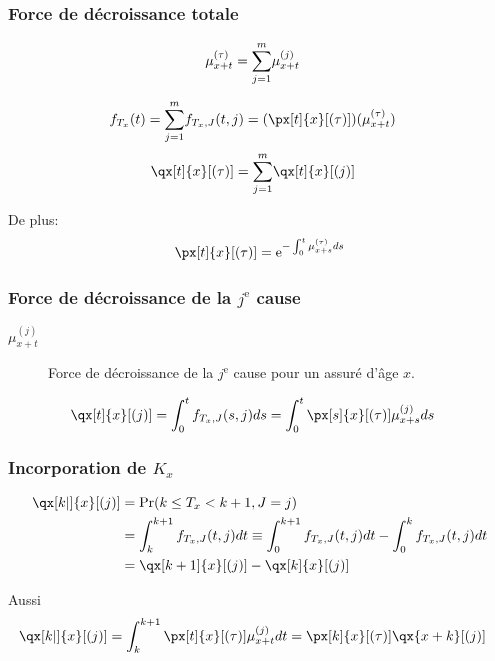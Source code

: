 \documentclass[10pt, french]{article}
\begin{document}
\begin{multicols*}{2}
\subsubsection*{Force de décroissance totale}
\begin{align*}
	\mu_{x + t}^{(\tau)}
	&=	\overset{m}{\underset{j = 1}{\sum}} \mu_{x + t}^{(j)}
\end{align*}

\begin{align*}
	f_{T_{x}}(t)
	&=	\sumz{m}{j = 1}f_{T_{x}, J}(t, j)	
	=	(\px[t]{x}[(\tau)])(\mu_{x + t}^{(\tau)})
\end{align*}
\begin{align*}
	\qx[t]{x}[(\tau)]
	&=	\sumz{m}{j = 1} \qx[t]{x}[(j)]
\end{align*}

De plus:
\begin{align*}
	\px[t]{x}[(\tau)]
	=	\textrm{e}^{-\int_{0}^{t} \mu_{x + s}^{(\tau)}ds}
\end{align*}

\subsubsection*{Force de décroissance de la $j^{\text{e}}$ cause}
\begin{description}
	\item[$\mu_{x + t}^{(j)}$]	Force de décroissance de la $j^{\text{e}}$ cause pour un assuré d'âge $x$.
\end{description}
\begin{align*}
	\qx[t]{x}[(j)]
	&=	\int_{0}^{t} f_{T_{x}, J}(s, j)ds
	=	\int_{0}^{t} \px[s]{x}[(\tau)] \mu_{x + s}^{(j)}ds
\end{align*}

\subsubsection*{Incorporation de $K_{x}$}
\begin{align*}
	\qx[k|]{x}[(j)]
	&=	\Pr(k \leq T_{x} < k + 1, J = j)	\\
	&=	\int_{k}^{k + 1} f_{T_{x}, J}(t, j)dt
	\equiv	\int_{0}^{k + 1} f_{T_{x}, J}(t, j)dt - \int_{0}^{k} f_{T_{x}, J}(t, j)dt	\\
	&=	\qx[k + 1]{x}[(j)] - \qx[k]{x}[(j)]
\end{align*}

Aussi
\begin{align*}
	\qx[k|]{x}[(j)]
	&=	\int_{k}^{k + 1} \px[t]{x}[(\tau)] \mu_{x + t}^{(j)}dt
	=	\px[k]{x}[(\tau)] \qx{x + k}[(j)]
\end{align*}

\end{multicols*}
\end{document}
